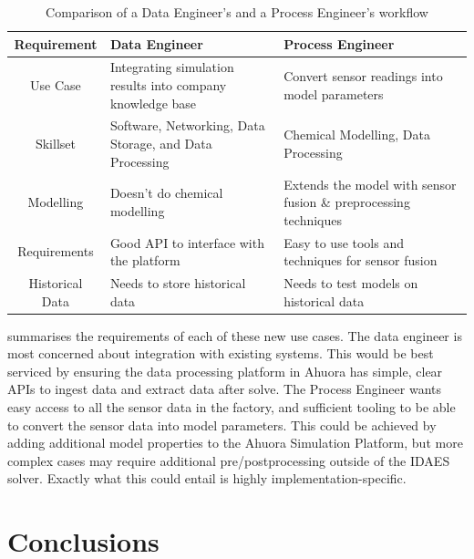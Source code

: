 \begin{table}[ht]
    \centering
    \caption{Comparison of a Data Engineer's and a Process Engineer's workflow}
    \begin{tabular}{|c|p{}|p{}|}
        \hline
        \textbf{Requirement} & \textbf{Data Engineer} & \textbf{Process Engineer} \\
        \hline
        Use Case & Integrating simulation results into company knowledge base & Convert sensor readings into model parameters \\
        \hline
        Skillset & Software, Networking, Data Storage, and Data Processing  & Chemical Modelling, Data Processing \\
        \hline
        Modelling & Doesn't do chemical modelling & Extends the model with sensor fusion \& preprocessing techniques\\
        \hline
        Requirements & Good API to interface with the platform & Easy to use tools and techniques for sensor fusion \\
        \hline
        Historical Data & Needs to store historical data & Needs to test models on historical data \\
        \hline
    \end{tabular}
    \label{tab:morerequirements}
\end{table}


 summarises the requirements of each of these new use cases. The data engineer is most concerned about integration with existing systems. This would be best serviced by ensuring the data processing platform in Ahuora has simple, clear APIs to ingest data and extract data after solve. The Process Engineer wants easy access to all the sensor data in the factory, and sufficient tooling to be able to convert the sensor data into model parameters. This could be achieved by adding additional model properties to the Ahuora Simulation Platform, but more complex cases may require additional pre/postprocessing outside of the IDAES solver. Exactly what this could entail is highly implementation-specific.

\section{Conclusions}


